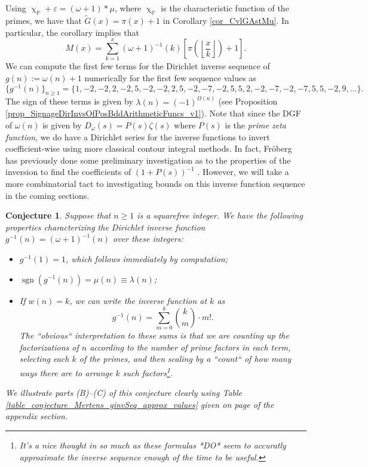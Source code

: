 \documentclass[11pt,reqno,a4letter]{article}
\numberwithin{figure}{section}
\numberwithin{table}{section}
\renewcommand{\chi}{\upchi}
\newcommand{\Floor}[2]{\ensuremath{\left\lfloor \frac{#1}{#2} \right\rfloor}}
\theoremstyle{plain}
\newtheorem{conjecture}[theorem]{Conjecture}
\numberwithin{theorem}{section}
\theoremstyle{definition}
\begin{document}
Using $\chi_{\mathbb{P}} + \varepsilon = (\omega + 1) \ast \mu$, 
where $\chi_{\mathbb{P}}$ is the characteristic 
function of the primes, we have that $\widetilde{G}(x) = \pi(x) + 1$ in 
Corollary \ref{cor_CvlGAstMu}. 
In particular, the corollary implies that 
\begin{equation} 
\label{eqn_Mx_gInvnPixk_formula} 
M(x) = \sum_{k=1}^{x} (\omega+1)^{-1}(k) \left[\pi\left(\Floor{x}{k}\right) + 1\right]. 
\end{equation} 
We can compute the first few terms for the
Dirichlet inverse sequence of 
$g(n) := \omega(n) + 1$ numerically for the first few sequence values as 
\[
\{g^{-1}(n)\}_{n \geq 1} = \{1, -2, -2, 2, -2, 5, -2, -2, 2, 5, -2, -7, -2, 5, 5, 2, -2, -7, -2, 
     -7, 5, 5, -2, 9, \ldots \}. 
\] 
The sign of these terms is given by $\lambda(n) = (-1)^{\Omega(n)}$ 
(see Proposition \ref{prop_SignageDirInvsOfPosBddArithmeticFuncs_v1}). 
Note that since the DGF of $\omega(n)$ is given by 
$D_{\omega}(s) = P(s) \zeta(s)$ where $P(s)$ is the \emph{prime zeta function}, we do have a 
Dirichlet series for the inverse functions to invert coefficient-wise using more classical 
contour integral methods. 
In fact, Fr\"oberg has previously done some preliminary investigation as to the properties of the 
inversion to find the coefficients of $(1+P(s))^{-1}$ \cite{FROBERG-1968}. 
However, we will take a more combinatorial tact to investigating bounds on this inverse function 
sequence in the coming sections. 

\begin{conjecture}
\label{lemma_gInv_MxExample} 
Suppose that $n \geq 1$ is a squarefree integer. We have the following properties characterizing the 
Dirichlet inverse function $g^{-1}(n) = (\omega+1)^{-1}(n)$ over these integers: 
\begin{itemize} 

\item[(A)] $g^{-1}(1) = 1$, which follows immediately by computation; 
\item[(B)] $\operatorname{sgn}(g^{-1}(n)) = \mu(n) \equiv \lambda(n)$; 
\item[(C)] If $w(n) = k$, we can write the inverse function at $k$ as 
     \[
     g^{-1}(n) = \sum_{m=0}^{k} \binom{k}{m} \cdot m!. 
     \]
     The ``obvious`` interpretation to these sums is that we are counting up the factorizations of 
     $n$ according to the number of prime factors in each term, selecting each $k$ of the primes, and then 
     scaling by a ``count`` of how many ways there are to arrange $k$ such factors\footnote{
          \emph{It's a nice thought in so much as these formulas *DO* seem to accuratly approximate the 
          inverse sequence enough of the time to be useful.}
           }.
\end{itemize} 
We illustrate parts (B)--(C) of this conjecture clearly using 
Table \ref{table_conjecture_Mertens_ginvSeq_approx_values} given on 
page \pageref{table_conjecture_Mertens_ginvSeq_approx_values} of the appendix section. 
\end{conjecture} 
\end{document}
